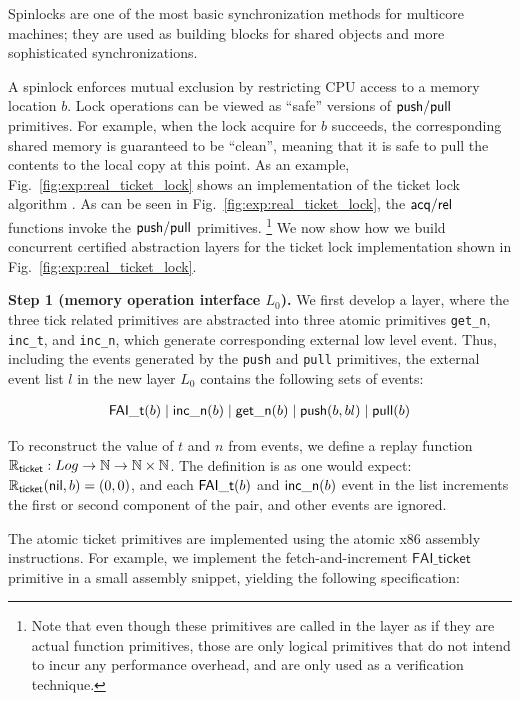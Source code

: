 Spinlocks are one of the most basic synchronization
methods for multicore machines; they are used as building
blocks for shared objects and more sophisticated synchronizations.


A spinlock enforces mutual exclusion by restricting CPU access to
a memory location $b$. Lock operations can be viewed
as ``safe'' versions of $\mathsf{push}/\mathsf{pull}$ primitives.
For example, when the lock acquire  for $b$ succeeds,
the corresponding shared memory is guaranteed
to be ``clean'', meaning that it is safe to 
pull the contents to the local copy at this point.
As an example, Fig.~\ref{fig:exp:real_ticket_lock} shows
an implementation of the ticket lock algorithm \cite{mcs91}.
As can be seen in Fig.~\ref{fig:exp:real_ticket_lock},
the $\mathsf{acq}/\mathsf{rel}$ functions invoke the $\mathsf{push}/\mathsf{pull}$ primitives.
\footnote{Note that even though these primitives are
called in the layer as if they are actual function primitives,
those are only logical primitives that do not intend to incur
any performance overhead, and are only used as a verification
technique.}
We now show how we build concurrent certified abstraction layers
for the ticket lock implementation shown
in Fig.~\ref{fig:exp:real_ticket_lock}.

\noindent\textbf{Step 1 (memory operation interface $L_0$).}
We first develop a layer, where the three tick related primitives
are abstracted into three atomic primitives \texttt{get\_n},
\texttt{inc\_t}, and \texttt{inc\_n}, which generate corresponding
external low level event. Thus, including the events generated by the
\texttt{push} and \texttt{pull} primitives, the external event list
$l$ in the new layer $L_0$ contains the following sets of events:

\[
\begin{array}{c}
\mathsf{\textcolor{black}{FAI\_t}}(b) \mid \mathsf{\textcolor{black}{inc\_n}}(b) \mid \mathsf{\textcolor{black}{get\_n}}(b)
\mid \mathsf{push}(b,bl) \mid \mathsf{pull}(b)
\end{array}
\] 

To reconstruct the value of $t$ and $n$ from events, we define a replay
function $\mathbb{R}_{\mathsf{\textcolor{black}{ticket}}} : Log \to \mathbb{N} \to \mathbb{N}\times \mathbb{N}$. 
The definition is as one would expect:
$\mathbb{R}_{\mathsf{\textcolor{black}{ticket}}}(\mathsf{nil}, b) = (0,0)$, and each 
$\mathsf{\textcolor{black}{FAI\_t}}(b)$ and $\mathsf{\textcolor{black}{inc\_n}}(b)$ event in the list increments
the first or second component of the pair, and other events are ignored.

The atomic ticket primitives are implemented using the atomic x86 assembly
instructions. For example, we implement the
fetch-and-increment $\mathsf{FAI\_ticket}$ primitive in a small 
assembly snippet, yielding the following specification:

